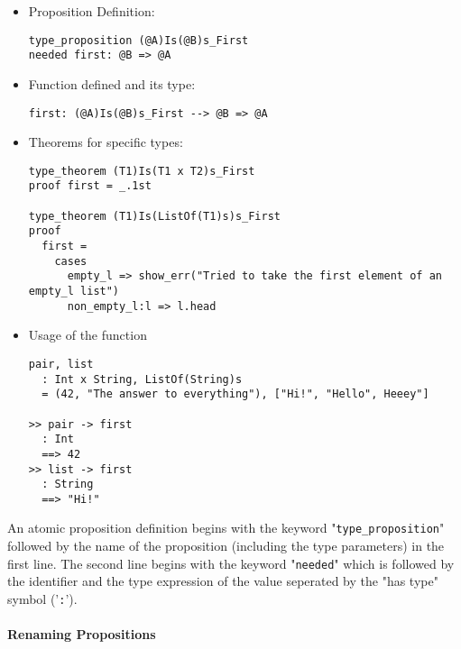 \documentclass{article}
\begin{document}
\begin{itemize}
\begin{itemize}
\item Proposition Definition:

\begin{verbatim}
type_proposition (@A)Is(@B)s_First
needed first: @B => @A
\end{verbatim}

\item Function defined and its type:

\begin{verbatim}
first: (@A)Is(@B)s_First --> @B => @A
\end{verbatim}

\item Theorems for specific types:

\begin{verbatim}
type_theorem (T1)Is(T1 x T2)s_First
proof first = _.1st

type_theorem (T1)Is(ListOf(T1)s)s_First
proof
  first =
    cases
      empty_l => show_err("Tried to take the first element of an empty_l list")
      non_empty_l:l => l.head
\end{verbatim}

\item Usage of the function
\begin{verbatim}
pair, list
  : Int x String, ListOf(String)s
  = (42, "The answer to everything"), ["Hi!", "Hello", Heeey"]

>> pair -> first
  : Int
  ==> 42
>> list -> first
  : String
  ==> "Hi!"
\end{verbatim}
\end{itemize}

An atomic proposition definition begins with the keyword
"\verb|type_proposition|" followed by the name of the proposition (including
the type parameters) in the first line. The second line begins with the keyword
"\verb|needed|" which is followed by the identifier and the
type expression of the value seperated by the "has type" symbol ('\verb|:|').

\end{itemize}

\newpage

\paragraph{Renaming Propositions}
\end{document}

